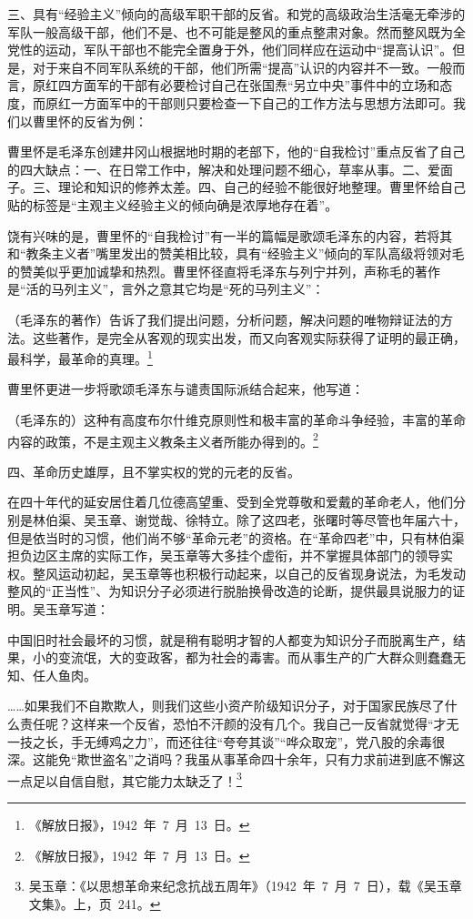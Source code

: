 三、具有“经验主义”倾向的高级军职干部的反省。和党的高级政治生活毫无牵涉的军队一般高级干部，他们不是、也不可能是整风的重点整肃对象。然而整风既为全党性的运动，军队干部也不能完全置身于外，他们同样应在运动中“提高认识”。但是，对于来自不同军队系统的干部，他们所需“提高”认识的内容并不一致。一般而言，原红四方面军的干部有必要检讨自己在张国焘“另立中央”事件中的立场和态度，而原红一方面军中的干部则只要检查一下自己的工作方法与思想方法即可。我们以曹里怀的反省为例：

曹里怀是毛泽东创建井冈山根据地时期的老部下，他的“自我检讨”重点反省了自己的四大缺点：一、在日常工作中，解决和处理问题不细心，草率从事。二、爱面子。三、理论和知识的修养太差。四、自己的经验不能很好地整理。曹里怀给自己贴的标签是“主观主义经验主义的倾向确是浓厚地存在着”。

饶有兴味的是，曹里怀的“自我检讨”有一半的篇幅是歌颂毛泽东的内容，若将其和“教条主义者”嘴里发出的赞美相比较，具有“经验主义”倾向的军队高级将领对毛的赞美似乎更加诚挚和热烈。曹里怀径直将毛泽东与列宁并列，声称毛的著作是“活的马列主义”，言外之意其它均是“死的马列主义”：

\begin{quoting}
（毛泽东的著作）告诉了我们提出问题，分析问题，解决问题的唯物辩证法的方法。这些著作，是完全从客观的现实出发，而又向客观实际获得了证明的最正确，最科学，最革命的真理。\footnote{《解放日报》，1942~年~7~月~13~日。}
\end{quoting}

曹里怀更进一步将歌颂毛泽东与谴责国际派结合起来，他写道：

\begin{quoting}
（毛泽东的）这种有高度布尔什维克原则性和极丰富的革命斗争经验，丰富的革命内容的政策，不是主观主义教条主义者所能办得到的。\footnote{《解放日报》，1942~年~7~月~13~日。}
\end{quoting}

四、革命历史雄厚，且不掌实权的党的元老的反省。

在四十年代的延安居住着几位德高望重、受到全党尊敬和爱戴的革命老人，他们分别是林伯渠、吴玉章、谢觉哉、徐特立。除了这四老，张曙时等尽管也年届六十，但是依当时的习惯，他们尚不够“革命元老”的资格。在“革命四老”中，只有林伯渠担负边区主席的实际工作，吴玉章等大多挂个虚衔，并不掌握具体部门的领导实权。整风运动初起，吴玉章等也积极行动起来，以自己的反省现身说法，为毛发动整风的“正当性”、为知识分子必须进行脱胎换骨改造的论断，提供最具说服力的证明。吴玉章写道：

\begin{quoting}
中国旧时社会最坏的习惯，就是稍有聪明才智的人都变为知识分子而脱离生产，结果，小的变流氓，大的变政客，都为社会的毒害。而从事生产的广大群众则蠢蠢无知、任人鱼肉。

……如果我们不自欺欺人，则我们这些小资产阶级知识分子，对于国家民族尽了什么责任呢？这样来一个反省，恐怕不汗颜的没有几个。我自己一反省就觉得“才无一技之长，手无缚鸡之力”，而还往往“夸夸其谈”“哗众取宠”，党八股的余毒很深。这能免“欺世盗名”之诮吗？我虽从事革命四十余年，只有力求前进到底不懈这一点足以自信自慰，其它能力太缺乏了！\footnote{吴玉章：《以思想革命来纪念抗战五周年》（1942~年~7~月~7~日），载《吴玉章文集》。上，页~241。}
\end{quoting}

